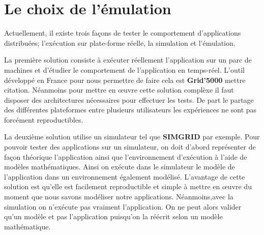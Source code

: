 \section{Le choix de l'émulation}

Actuellement, il existe trois façons de tester le comportement d'applications distribuées; l'exécution sur plate-forme réelle, la simulation et l'émulation. 

La première solution consiste à exécuter réellement l'application sur un parc de machines et d'étudier le comportement de l'application en temps-réel. L'outil développé en France pour nous permettre de faire cela est \textbf{Grid'5000} {\color{red}mettre citation}. Néanmoins pour mettre en \oe uvre cette solution complèxe il faut disposer des architectures nécessaires pour effectuer les tests. De part le partage des différentes plateformes entre plusieurs utilisateurs les expériences ne sont pas forcément reproductibles. 

La deuxième solution utilise un simulateur tel que \textbf{SIMGRID}\cite{MARTIN:SimGrid} par exemple. Pour pouvoir tester des applications sur un simulateur, on doit d'abord représenter de façon théorique l'application ainsi que l'environnement d'exécution à l'aide de modèles mathématiques. Ainsi on exécute dans le simulateur le modèle de l'application dans un environnement également modélisé. L'avantage de cette solution est qu'elle est facilement reproductible et simple à mettre en \oe uvre du moment que nous savons modéliser notre applications. Néanmoins,avec la simulation on n'exécute pas vraiment l'application. On ne peut alors valider qu'un modèle et pas l'application puisqu'on la réécrit selon un modèle mathématique. 

